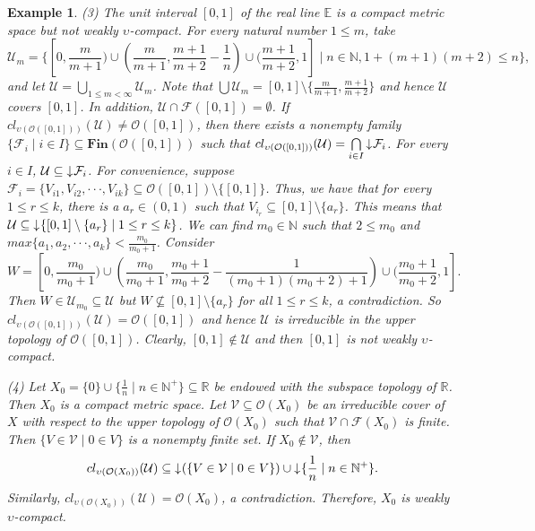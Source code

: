 \documentclass[preprint,12pt]{elsarticle}
\numberwithin{equation}{section}
\newtheorem{example}[theorem]{Example}
\newcommand{\dn}{\mathord{\downarrow}\hspace{0.05em}}
\begin{document}
\begin{example}
{(3) The unit interval $[0,1]$ of the real line $\mathbb{E}$ is a compact metric space but not weakly $\upsilon$-compact. For every natural number $1\leq m$, take $$\mathcal{U}_{m}=\{[0,\frac{m}{m+1})\cup(\frac{m}{m+1},\frac{m+1}{m+2}-\frac{1}{n})\cup(\frac{m+1}{m+2},1]\mid n\in\mathbb{N}, 1+(m+1)(m+2)\leq n\},$$
and let $\mathcal{U}=\bigcup\limits_{1\leq m<\infty}\mathcal{U}_{m}$. Note that $\bigcup\mathcal{U}_{m}=[0,1]\setminus\{\frac{m}{m+1},\frac{m+1}{m+2}\}$ and hence $\mathcal{U}$ covers $[0,1]$. In addition, $\mathcal{U}\cap \mathscr{F}([0,1])=\emptyset$.
If $cl_{\upsilon(\mathcal{O}([0,1]))}(\mathcal{U})\neq\mathcal{O}([0,1])$, then there exists a nonempty family $\{\mathcal{F}_{i}\mid i\in I\}\subseteq\mathbf{Fin}(\mathcal{O}([0,1]))$ such that $cl_{\upsilon(\mathcal{O}([0,1]))}(\mathcal{U})=\bigcap\limits_{i\in I}\dn \mathcal{F}_{i}$. For every $i\in I$, $\mathcal{U}\subseteq\dn \mathcal{F}_{i}$. For convenience, suppose $\mathcal{F}_{i}=\{V_{i1},V_{i2},\cdot\cdot\cdot,V_{ik}\}\subseteq\mathcal{O}([0,1])\setminus\{[0,1]\}$. Thus, we have that for every $1\leq r\leq k$, there is a $a_{r}\in(0,1)$ such that $V_{i_{r}}\subseteq[0,1]\setminus\{a_{r}\}$. This means that $\mathcal{U}\subseteq\dn\{[0,1]\setminus\{a_{r}\}\mid 1\leq r\leq k \}$. We can find  $m_{0}\in\mathbb{N}$ such that $2\leq m_{0}$ and $max\{a_{1},a_{2},\cdot\cdot\cdot,a_{k}\}<\frac{m_{0}}{m_{0}+1}$. Consider $$W=[0,\frac{m_{0}}{m_{0}+1})\cup(\frac{m_{0}}{m_{0}+1},\frac{m_{0}+1}{m_{0}+2}-\frac{1}{(m_{0}+1)(m_{0}+2)+1})\cup(\frac{m_{0}+1}{m_{0}+2},1].$$ Then $W\in\mathcal{U}_{m_{0}}\subseteq\mathcal{U}$ but $W\not\subseteq[0,1]\setminus\{a_{r}\}$ for all $1\leq r\leq k$, a contradiction. So $cl_{\upsilon(\mathcal{O}([0,1]))}(\mathcal{U})=\mathcal{O}([0,1])$ and hence $\mathcal{U}$ is irreducible in the upper topology of $\mathcal{O}([0,1])$. Clearly, $[0,1]\not\in\mathcal{U}$ and then $[0,1]$ is not weakly $\upsilon$-compact.

(4) Let $X_{0}=\{0\}\cup\{\frac{1}{n}\mid n\in\mathbb{N}^{+}\}\subseteq\mathbb{R}$ be endowed with the subspace topology of $\mathbb{R}$. Then $X_{0}$ is a compact metric space. Let $\mathcal{V}\subseteq\mathcal{O}(X_{0})$ be an irreducible cover of $X$ with respect to the upper topology of $\mathcal{O}(X_{0})$ such that $\mathcal{V}\cap\mathscr{F}(X_{0})$ is finite. Then $\{V\in\mathcal{V}\mid 0\in V\}$ is a nonempty finite set. If $X_{0}\not\in \mathcal{V}$, then $$cl_{\upsilon(\mathcal{O}(X_{0}))}(\mathcal{U})\subseteq \dn(\{V\in\mathcal{V}\mid 0\in V\})\cup\dn\{\frac{1}{n}\mid n\in\mathbb{N}^{+}\}.$$ Similarly, $cl_{\upsilon(\mathcal{O}(X_{0}))}(\mathcal{U})=\mathcal{O}(X_{0})$, a contradiction. Therefore, $X_{0}$ is weakly $\upsilon$-compact.}

\end{example}
\end{document}
